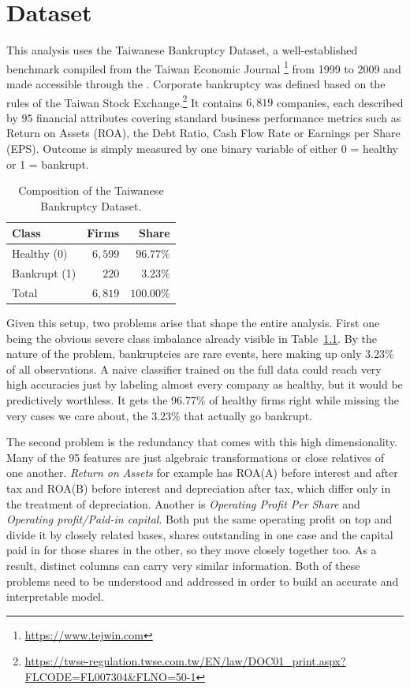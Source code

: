 \chapter{Dataset}
\label{ch:dataset}

This analysis uses the Taiwanese Bankruptcy Dataset, a well-established benchmark
compiled from the Taiwan Economic Journal \footnote{\url{https://www.tejwin.com}} from 1999 to 2009 and made accessible
through the \textcite{uci_taiwan}. Corporate bankruptcy was defined based on the
rules of the Taiwan Stock Exchange.\footnote{\url{https://twse-regulation.twse.com.tw/EN/law/DOC01_print.aspx?FLCODE=FL007304&FLNO=50-1}} 
It contains $6{,}819$ companies, each described by $95$ financial attributes covering standard business performance metrics such as 
Return on Assets (ROA), the Debt Ratio, Cash Flow Rate or Earnings per Share (EPS). Outcome is simply measured by one binary variable 
of either 0 = healthy or 1 = bankrupt.

\begin{table}[htbp]
  \centering
  \caption{Composition of the Taiwanese Bankruptcy Dataset.}
  \label{tab:dataset}
  \begin{tabular}{lrr}
    \toprule
    \textbf{Class} & \textbf{Firms} & \textbf{Share} \\
    \midrule
    Healthy (0)   & $6{,}599$ & $96.77\%$ \\
    Bankrupt (1)  & $220$     & $3.23\%$  \\
    \midrule
    Total         & $6{,}819$ & $100.00\%$ \\
    \bottomrule
  \end{tabular}
\end{table}

Given this setup, two problems arise that shape the entire analysis. First one being the obvious severe class imbalance 
already visible in Table~\ref{tab:dataset}. By the nature of the problem, bankruptcies are rare events, here making up only 3.23\% 
of all observations. A naive classifier trained on the full data could reach very high accuracies just by labeling almost every company as 
healthy, but it would be predictively worthless. It gets the 96.77\% of healthy firms right while missing the very cases we care about, 
the 3.23\% that actually go bankrupt. 

The second problem is the redundancy that comes with this high dimensionality. Many of the 95 features are just algebraic transformations 
or close relatives of one another. \emph{Return on Assets} for example has ROA(A) before interest and after tax and ROA(B) before interest and 
depreciation after tax, which differ only in the treatment of depreciation. Another is \emph{Operating Profit Per Share} and \emph{Operating profit/Paid-in capital}.
Both put the same operating profit on top and divide it by closely related bases, shares outstanding in one case and the capital paid in for those shares
in the other, so they move closely together too. As a result, distinct columns can carry very similar information. 
Both of these problems need to be understood and addressed in order to build an accurate and interpretable
model.

